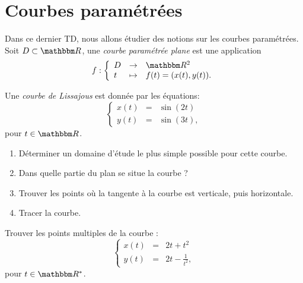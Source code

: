 \section{Courbes paramétrées}

Dans ce dernier TD, nous allons étudier des notions sur les courbes paramétrées. Soit $D \subset \eR$, une \emph{courbe paramétrée plane} est une application
\[
f : \left \{
\begin{array}{lcl}
D & \rightarrow & \eR^2 \\
t & \mapsto & f(t) = (x(t),y(t)).
\end{array}
\right .
\]

\medskip

\begin{exercice}

Une \emph{courbe de Lissajous} est donnée par les équations:
\[
\left \{
\begin{array}{lcl}
x(t) & = & \sin(2t) \\
y(t) & = & \sin(3t),
\end{array}
\right .
\]
pour $t\in\eR$.

\begin{enumerate}
\item Déterminer un domaine d'étude le plus simple possible pour cette courbe.

\item Dans quelle partie du plan se situe la courbe ?

\item Trouver les points où la tangente à la courbe est verticale, puis horizontale.

\item Tracer la courbe.

\end{enumerate}

\end{exercice}

\medskip

\begin{exercice}

Trouver les points multiples de la courbe :
\[
\left \{
\begin{array}{lcl}
x(t) & = & 2t + t^2 \\
y(t) & = & 2t - \frac1{t^2},
\end{array}
\right .
\]
pour $t\in\eR^*$.

\end{exercice}

\medskip

